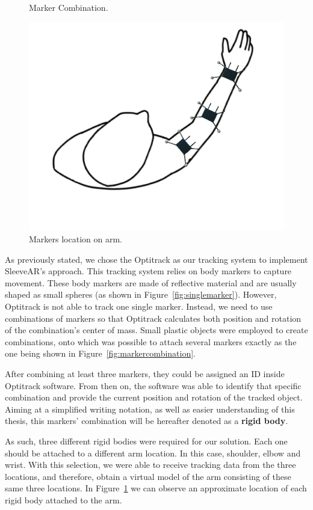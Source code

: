 \begin{figure}
    \caption{Marker Combination.}
    \label{fig:markercombination}
    \endminipage\hfill
{}
  \centering
  \includegraphics[width=\linewidth]{imgs/impl/rigidbodiesattached}
    \caption{Markers location on arm.}
    \label{fig:rigidbodiesattached}
    \endminipage
\end{figure}


As previously stated, we chose the Optitrack as our tracking system to implement SleeveAR's approach. This tracking system relies on body markers to capture movement.
These body markers are made of reflective material and are usually shaped as small spheres (as shown in Figure~\ref{fig:singlemarker}).
However, Optitrack is not able to track one single marker. Instead, we need to use combinations of markers so that Optitrack calculates both 
position and rotation of the combination's center of mass. 
Small plastic objects were employed to create combinations, onto which was possible to attach several markers exactly as the one being shown in Figure~\ref{fig:markercombination}.

After combining at least three markers, they could be assigned an ID inside Optitrack software. 
From then on, the software was able to identify that specific combination and provide the current position and rotation of the tracked object. Aiming at a simplified writing notation, as well as easier understanding of this thesis, this markers' combination will be hereafter denoted as a \textbf{rigid body}.

As such, three different rigid bodies were required for our solution. Each one should be attached to a different arm location. In this case, shoulder, elbow and wrist. 
With this selection, we were able to receive tracking data from the three locations, and therefore, obtain a virtual model of the arm consisting of these same three locations. In Figure~\ref{fig:rigidbodiesattached} we can observe
an approximate location of each rigid body attached to the arm.

